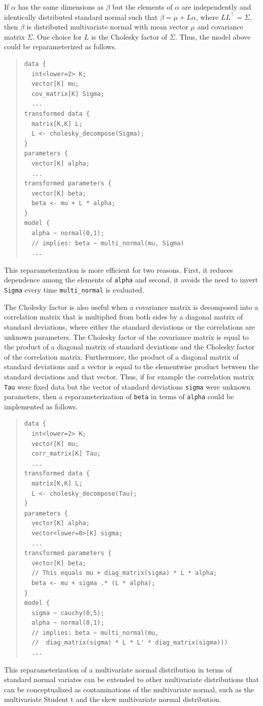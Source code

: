 If $\alpha$ has the same dimensions as $\beta$ but the elements of 
$\alpha$ are independently and identically distributed standard normal 
such that $\beta = \mu + L\alpha$, where $LL^\top = \Sigma$, then 
$\beta$ is distributed multivariate normal with mean vector $\mu$ and 
covariance matrix $\Sigma$. One choice for $L$ is the Cholesky factor
of $\Sigma$. Thus, the model above could be reparameterized as follows.
%
\begin{quote}
\begin{Verbatim}
data {
  int<lower=2> K;
  vector[K] mu;
  cov_matrix[K] Sigma;
  ...
transformed data {
  matrix[K,K] L;
  L <- cholesky_decompose(Sigma);
}
parameters {
  vector[K] alpha;
  ...
transformed parameters {
  vector[K] beta;
  beta <- mu + L * alpha; 
}
model {
  alpha ~ normal(0,1); 
  // implies: beta ~ multi_normal(mu, Sigma)
  ...
\end{Verbatim}
\end{quote}
%
This reparameterization is more efficient for two reasons. First, it
reduces dependence among the elements of \Verb|alpha| and second, it
avoids the need to invert \Verb|Sigma| every time \Verb|multi_normal|
is evaluated.

The Cholesky factor is also useful when a covariance matrix is 
decomposed into a correlation matrix that is multiplied from both
sides by a diagonal matrix of standard deviations, where either the
standard deviations or the correlations are unknown parameters. The
Cholesky factor of the covariance matrix is equal to the product of
a diagonal matrix of standard deviations and the Cholesky factor of
the correlation matrix. Furthermore, the product of a diagonal matrix
of standard deviations and a vector is equal to the elementwise
product between the standard deviations and that vector. Thus, if for
example the correlation matrix \Verb|Tau| were fixed data but the
vector of standard deviations \Verb|sigma| were unknown parameters,
then a reparameterization of \Verb|beta| in terms of \Verb|alpha|
could be implemented as follows.
%
\begin{quote}
\begin{Verbatim}
data {
  int<lower=2> K;
  vector[K] mu;
  corr_matrix[K] Tau;
  ...
transformed data {
  matrix[K,K] L;
  L <- cholesky_decompose(Tau);
}
parameters {
  vector[K] alpha;
  vector<lower=0>[K] sigma;
  ...
transformed parameters {
  vector[K] beta;
  // This equals mu + diag_matrix(sigma) * L * alpha;
  beta <- mu + sigma .* (L * alpha);
}
model {
  sigma ~ cauchy(0,5);
  alpha ~ normal(0,1);
  // implies: beta ~ multi_normal(mu,
  //  diag_matrix(sigma) * L * L' * diag_matrix(sigma)))
  ...
\end{Verbatim}
\end{quote}
%
This reparameterization of a multivariate normal distribution in
terms of standard normal variates can be extended to other multivariate
distributions that can be conceptualized as contaminations of the 
multivariate normal, such as the multivariate Student t and the skew
multivariate normal distribution.

